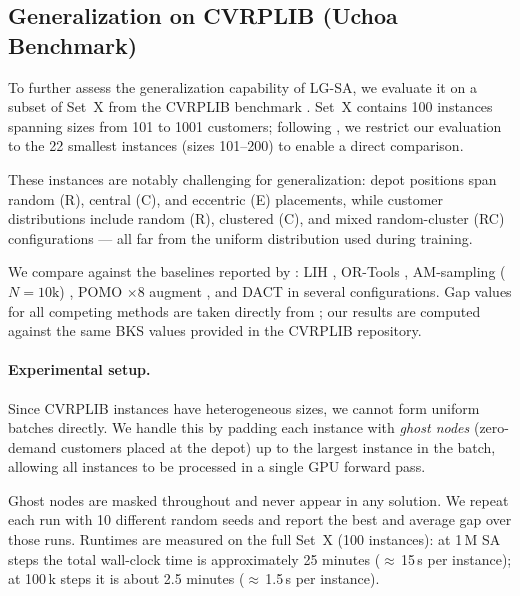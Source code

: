 \documentclass[letterpaper]{article} %
\begin{document}

\subsection{Generalization on CVRPLIB (Uchoa Benchmark)}
\label{sec:uchoa_generalization}

To further assess the generalization capability of LG-SA, we evaluate it on a subset of Set~X from the CVRPLIB benchmark \citep{uchoa_new_2017}. Set~X contains 100 instances spanning sizes from 101 to 1001 customers; following \citet{ma_learning_2021}, we restrict our evaluation to the 22 smallest instances (sizes 101–200) to enable a direct comparison.

These instances are notably challenging for generalization: depot positions span random (R), central (C), and eccentric (E) placements, while customer distributions include random (R), clustered (C), and mixed random-cluster (RC) configurations — all far from the uniform distribution used during training.

We compare against the baselines reported by \citet{ma_learning_2021}: LIH \citep{wu_learning_2022}, OR-Tools \citep{ortools_routing}, AM-sampling ($N{=}10\text{k}$) \citep{kool_attention_2019}, POMO $\times$8 augment \citep{kwon_pomo_2021}, and DACT \citep{ma_learning_2021} in several configurations.
Gap values for all competing methods are taken directly from \citet{ma_learning_2021}; our results are computed against the same BKS values provided in the CVRPLIB repository.

\paragraph{Experimental setup.}
Since CVRPLIB instances have heterogeneous sizes, we cannot form uniform batches directly.
We handle this by padding each instance with \emph{ghost nodes} (zero-demand customers placed at the depot) up to the largest instance in the batch, allowing all instances to be processed in a single GPU forward pass.

Ghost nodes are masked throughout and never appear in any solution.
We repeat each run with 10 different random seeds and report the best and average gap over those runs.
Runtimes are measured on the full Set~X (100 instances): at 1\,M SA steps the total wall-clock time is approximately 25 minutes ($\approx$\,15\,s per instance); at 100\,k steps it is about 2.5 minutes ($\approx$\,1.5\,s per instance).
\end{document}
